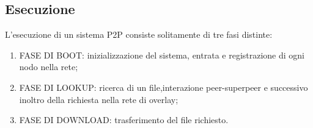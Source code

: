 \subsection{Esecuzione}
L'esecuzione di un sistema P2P consiste solitamente di tre fasi distinte:
\begin{enumerate}
\item FASE DI BOOT: inizializzazione del sistema, entrata e registrazione di ogni nodo nella rete;
\item FASE DI LOOKUP: ricerca di un file,interazione peer-superpeer e successivo inoltro della richiesta nella rete di overlay;
\item FASE DI DOWNLOAD: trasferimento del file richiesto. 
\end{enumerate}


